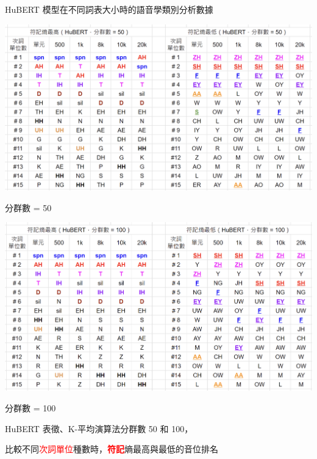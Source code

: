 {{\begin{table}[!htbp]
            \caption{HuBERT 模型在不同詞表大小時的語音學類別分析數據}
            \label{tab:new--hubert-pcls-results}
        \end{table}
    }


    {
        \begin{table}
            \centering
            \begin{subtable}{\textwidth}
                \centering
                \includegraphics[width=1\linewidth]{figures/ch4figs/phnrank-hub50pcs.png}
                \caption{分群數 = 50}
                \label{subtabfig:hub-u050-phnrank-hub50pcs}
            \end{subtable}
            \vfill
            \begin{subtable}{\textwidth}
                \centering
                \includegraphics[width=1\linewidth]{figures/ch4figs/phnrank-hub100pcs.png}
                \caption{分群數 = 100}
                \label{subtabfig:hub-u050-phnrank-hub100pcs}
            \end{subtable}
    
            \caption{HuBERT 表徵、K-平均演算法分群數 50 和 100，}
            比較不同\textcolor{red}{次詞單位}種數時，\textbf{\textcolor{red}{符記}}熵最高與最低的音位排名
            \label{tabfig:hub-u050-phnrank}
        \end{table}
    }

}
